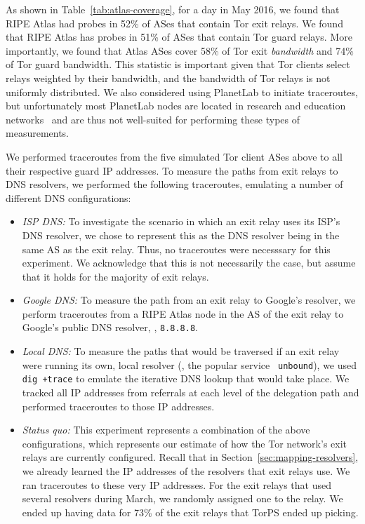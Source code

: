 As shown in
Table~\ref{tab:atlas-coverage}, for a day in May 2016, we found that
RIPE Atlas had probes in 52\% of ASes that contain Tor exit relays.  We
found that RIPE Atlas has probes in 51\% of ASes that contain Tor guard
relays.  More importantly, we found that Atlas ASes cover 58\% of Tor
exit \textit{bandwidth} and 74\% of Tor guard bandwidth. This statistic
is important given that Tor clients select relays weighted by their bandwidth,
and the bandwidth of Tor relays is not uniformly distributed.
We also considered using PlanetLab to initiate traceroutes, but
unfortunately most PlanetLab nodes are located in research and education
networks~\cite{banerjee2004interdomain} and are thus not well-suited for
performing these types of measurements.

We performed traceroutes from the five simulated Tor client ASes above to all
their respective guard IP addresses.  To measure the paths from exit relays to
DNS resolvers, we performed the following traceroutes, emulating a number of
different DNS configurations:
\begin{itemize}
    \item \emph{ISP DNS:} To investigate the scenario in which an exit 
      relay uses its ISP's DNS resolver, we chose to represent this as 
      the DNS resolver being in the same AS as the exit relay. 
      Thus, no traceroutes were necesssary for this experiment. 
      We acknowledge that this is not necessarily the case, but assume that it
      holds for the majority of exit relays.

    \item \emph{Google DNS:} To measure the path from an exit relay to
      Google's resolver, we perform traceroutes from a RIPE Atlas node
      in the AS of the exit relay to Google's public DNS resolver, \ie,
      {\tt 8.8.8.8}.

    \item \emph{Local DNS:} To measure the paths that would be traversed if an
      exit relay were running its own, local resolver (\eg, the popular service {\tt
      unbound}), we used {\tt dig +trace} to emulate the
      iterative DNS lookup that would take place. We tracked all IP
      addresses from referrals at each level of the delegation path and
      performed traceroutes to those IP addresses.

    \item \emph{Status quo:} This experiment represents a combination of
      the above configurations, which represents our estimate of how the
      Tor network's exit relays are currently configured.  Recall that in
      Section~\ref{sec:mapping-resolvers}, we already learned the IP addresses
      of the resolvers that exit relays use.  We ran traceroutes to these very
      IP addresses.  For the exit relays that used several resolvers during
      March, we randomly assigned one to the relay.  We ended up having data for
      73\% of the exit relays that TorPS ended up picking.
\end{itemize}

